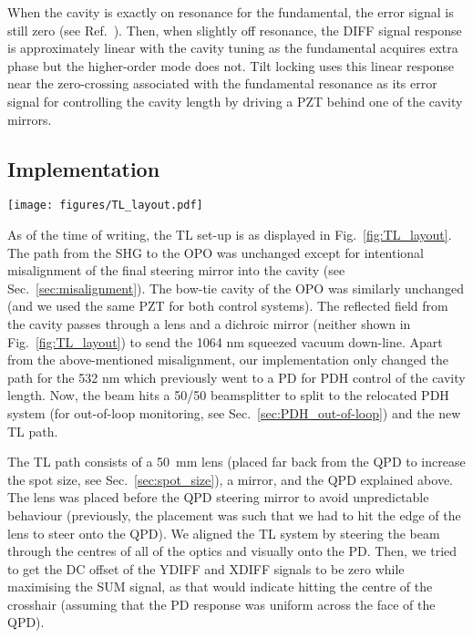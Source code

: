 \documentclass[aps,pra,superscriptaddress,reprint,nofootinbib]{revtex4-1}
\begin{document}
When the cavity is exactly on resonance for the fundamental, the error signal is still zero (see Ref.~\cite{TL:1999}). Then, when slightly off resonance, the DIFF signal response is approximately linear with the cavity tuning as the fundamental acquires extra phase but the higher-order mode does not. Tilt locking uses this linear response near the zero-crossing associated with the fundamental resonance as its error signal for controlling the cavity length by driving a PZT behind one of the cavity mirrors.


\subsection{Implementation}

\begin{figure*}
	\texttt{[image: figures/TL\_layout.pdf]}
	\caption{Schematic for tilt lock layout for cavity length control with PDH as an out-of-loop sensor.}
	\label{fig:TL_layout}
\end{figure*}

As of the time of writing, the TL set-up is as displayed in Fig.~\ref{fig:TL_layout}. The path from the SHG to the OPO was unchanged except for intentional misalignment of the final steering mirror into the cavity (see Sec.~\ref{sec:misalignment}). The bow-tie cavity of the OPO was similarly unchanged (and we used the same PZT for both control systems). The reflected field from the cavity passes through a lens and a dichroic mirror (neither shown in Fig.~\ref{fig:TL_layout}) to send the 1064 nm squeezed vacuum down-line. Apart from the above-mentioned misalignment, our implementation only changed the path for the 532 nm which previously went to a PD for PDH control of the cavity length. Now, the beam hits a 50/50 beamsplitter to split to the relocated PDH system (for out-of-loop monitoring, see Sec.~\ref{sec:PDH_out-of-loop}) and the new TL path.

The TL path consists of a 50~mm lens (placed far back from the QPD to increase the spot size, see Sec.~\ref{sec:spot_size}), a mirror, and the QPD explained above. The lens was placed before the QPD steering mirror to avoid unpredictable behaviour (previously, the placement was such that we had to hit the edge of the lens to steer onto the QPD). We aligned the TL system by steering the beam through the centres of all of the optics and visually onto the PD. Then, we tried to get the DC offset of the YDIFF and XDIFF signals to be zero while maximising the SUM signal, as that would indicate hitting the centre of the crosshair (assuming that the PD response was uniform across the face of the QPD).
\end{document}
